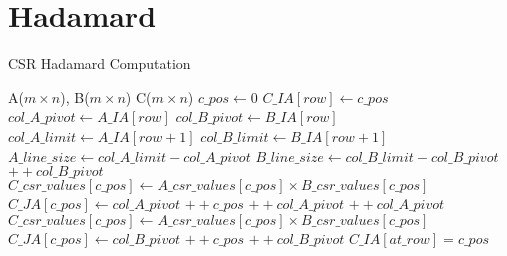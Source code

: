 \documentclass{article}
\begin{document}
\section{Hadamard}
\begin{algorithm}
\caption{CSR Hadamard Computation}\label{hada}
\begin{algorithmic}[1]

\Require A($m\times n$), B($m\times n$)
\Ensure C($m\times n$)
\Statex
\State $c\_pos \gets 0$
    \State $C\_IA[row] \gets c\_pos$
    \State $col\_A\_pivot \gets A\_IA[row]$
    \State $col\_B\_pivot \gets B\_IA[row]$
    \State $col\_A\_limit \gets A\_IA[row+1]$
    \State $col\_B\_limit \gets B\_IA[row+1]$
    \State $A\_line\_size \gets col\_A\_limit - col\_A\_pivot$
    \State $B\_line\_size \gets col\_B\_limit - col\_B\_pivot$
    \Statex
    \State $++col\_B\_pivot$
    \EndFor
               \State $C\_csr\_values[c\_pos] \gets A\_csr\_values[c\_pos] \times B\_csr\_values[c\_pos]$
               \State $C\_JA[c\_pos] \gets col\_A\_pivot$
               \State $++c\_pos$
            \EndIf
            \State $++col\_A\_pivot$
        \EndFor
    \Else
    \State $++col\_A\_pivot$
    \EndFor
               \State $C\_csr\_values[c\_pos] \gets A\_csr\_values[c\_pos] \times B\_csr\_values[c\_pos]$
               \State $C\_JA[c\_pos] \gets col\_B\_pivot$
               \State $++c\_pos$
            \EndIf
            \State $++col\_B\_pivot$
        \EndFor
    \EndIf
\EndFor
    \Statex
\State $C\_IA[at\_row]=c\_pos$
\end{algorithmic}
\end{algorithm}













\newpage
\end{document}
